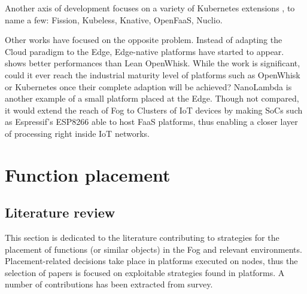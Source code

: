 \documentclass[11pt]{sdm}
\begin{document}
Another axis of development focuses on a variety of Kubernetes extensions \cite{bocci_secure_2021}, to name a few: Fission, Kubeless, Knative, OpenFaaS, Nuclio.

Other works have focused on the opposite problem. Instead of adapting the Cloud paradigm to the Edge, Edge-native platforms have started to appear. \citet{pfandzelter_tinyfaas_2020} shows better performances than Lean OpenWhisk. While the work is significant, could it ever reach the industrial maturity level of platforms such as OpenWhisk or Kubernetes once their complete adaption will be achieved?  NanoLambda is another example of a small platform placed at the Edge. Though not compared, it would extend the reach of Fog to Clusters of IoT devices by making \glspl{SoC} such as Espressif's ESP8266 \cite{noauthor_esp8266_nodate} able to host \gls{FaaS} platforms, thus enabling a closer layer of processing right inside \gls{IoT} networks.

\section{Function placement}
\label{sec:placement}

\subsection{Literature review \label{sec:literature_review}}

This section is dedicated to the literature contributing to strategies for the placement of functions (or similar objects) in the Fog and relevant environments. Placement-related decisions take place in platforms executed on nodes, thus the selection of papers is focused on exploitable strategies found in platforms. A number of contributions has been extracted from  survey.
\end{document}
